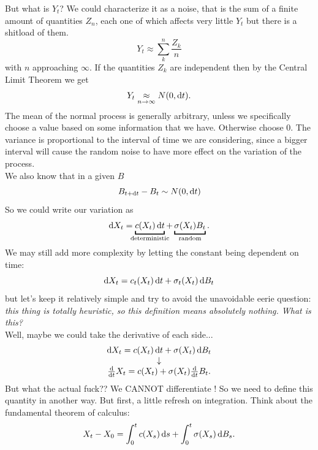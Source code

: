 \documentclass[crop=false, class=article]{standalone}
\begin{document}
But what is $Y_{t}$? We could characterize it as a noise, that is the sum of a finite amount of quantities $Z_{n}$, each one of which affects very little $Y_{t}$ but there is a shitload of them.
\[Y_{t}\approx\sum_{k}^{n}\frac{Z_{k}}{n}\]
with $n$ approaching $\infty$. If the quantities $Z_{k}$ are independent then by the Central Limit Theorem we get
\begin{equation*}
	Y_{t}\underset{n\to\infty}{\approx}N(0,\mathop{}\!\mathrm{d} t).
\end{equation*} 
The mean of the normal process is generally arbitrary, unless we specifically choose a value based on some information that we have. Otherwise choose 0. The variance is proportional to the interval of time we are considering, since a bigger interval will cause the random noise to have more effect on the variation of the process.\\
We also know that in a given \brm{} $B$
\begin{equation*}
	B_{t+\mathop{}\!\mathrm{d} t}-B_{t}\sim N(0,\mathop{}\!\mathrm{d} t)
\end{equation*}
So we could write our variation as
\begin{equation*}
	\dif X_{t}=\underbracket{c(X_{t})\dt}_{\mathclap{\text{deterministic}}}+\underbracket{\sigma(X_{t})B_{t}}_{\mathclap{\text{random}}}.
\end{equation*}
We may still add more complexity by letting the constant being dependent on time:
\begin{equation*}
	\mathop{}\!\mathrm{d} X_{t}=c_{t}(X_{t})\mathop{}\!\mathrm{d} t+\sigma_{t}(X_{t})\mathop{}\!\mathrm{d} B_{t}
\end{equation*}
but let's keep it relatively simple and try to avoid the unavoidable eerie question: \textit{this thing is totally heuristic, so this definition means absolutely nothing. What is this?}\\
Well, maybe we could take the derivative of each side...
\begin{equation*}
	\begin{array}{c}
		\mathop{}\!\mathrm{d} X_{t}=c(X_{t})\mathop{}\!\mathrm{d} t+\sigma(X_{t})\mathop{}\!\mathrm{d} B_{t}\\
		\downarrow\\
		\frac{\mathop{}\!\mathrm{d}}{\mathop{}\!\mathrm{d} t}X_{t}=c(X_{t})+\sigma(X_{t})\frac{\mathop{}\!\mathrm{d}}{\mathop{}\!\mathrm{d} t}B_{t}.
\end{array}
\end{equation*}
But what the actual fuck?? We CANNOT differentiate \brm! So we need to define this quantity in another way. But first, a little refresh on integration.
	Think about the fundamental theorem of calculus:
\begin{equation*}
	X_{t}-X_{0}=\int_{0}^{t}c(X_{s})\mathop{}\!\mathrm{d} s+\int_{0}^{t}\sigma(X_{s})\mathop{}\!\mathrm{d} B_{s}.
\end{equation*}
\end{document}
